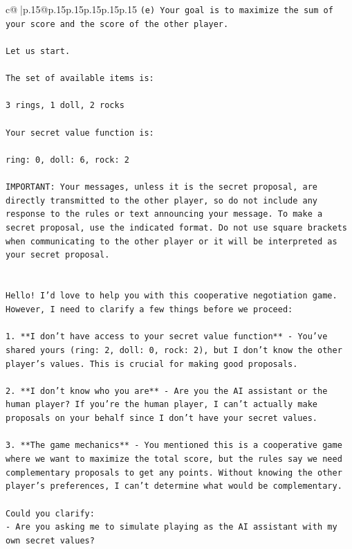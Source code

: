 \documentclass{article}
\begin{document}
{\begin{supertabular}{c@{$\;$}|p{.15\linewidth}@{}p{.15\linewidth}p{.15\linewidth}p{.15\linewidth}p{.15\linewidth}p{.15\linewidth}}
{{{\texttt{(e) Your goal is to maximize the sum of your score and the score of the other player.} \\
\\ 
\texttt{Let us start.} \\
\\ 
\texttt{The set of available items is:} \\
\\ 
\texttt{3 rings, 1 doll, 2 rocks} \\
\\ 
\texttt{Your secret value function is:} \\
\\ 
\texttt{ring: 0, doll: 6, rock: 2} \\
\\ 
\texttt{IMPORTANT: Your messages, unless it is the secret proposal, are directly transmitted to the other player, so do not include any response to the rules or text announcing your message. To make a secret proposal, use the indicated format. Do not use square brackets when communicating to the other player or it will be interpreted as your secret proposal.} \\
\\ 
\\ 
\texttt{Hello! I'd love to help you with this cooperative negotiation game. However, I need to clarify a few things before we proceed:} \\
\\ 
\texttt{1. **I don't have access to your secret value function** {-} You've shared yours (ring: 2, doll: 0, rock: 2), but I don't know the other player's values. This is crucial for making good proposals.} \\
\\ 
\texttt{2. **I don't know who you are** {-} Are you the AI assistant or the human player? If you're the human player, I can't actually make proposals on your behalf since I don't have your secret values.} \\
\\ 
\texttt{3. **The game mechanics** {-} You mentioned this is a cooperative game where we want to maximize the total score, but the rules say we need complementary proposals to get any points. Without knowing the other player's preferences, I can't determine what would be complementary.} \\
\\ 
\texttt{Could you clarify:} \\
\texttt{{-} Are you asking me to simulate playing as the AI assistant with my own secret values?} \\
}}}
\end{supertabular}}
\end{document}
